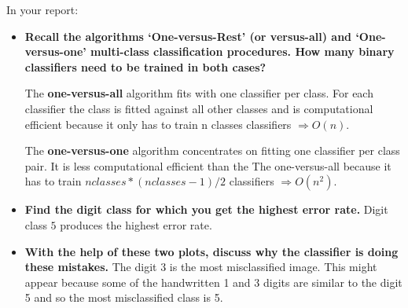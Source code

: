 \documentclass[a4paper]{article}
\begin{document}
In your report:
\begin{itemize}
\item \textbf{Recall the algorithms ‘One-versus-Rest’ (or versus-all) and ‘One-versus-one’ multi-class classification procedures. How many binary classifiers need to be trained in both cases?}

The \textbf{one-versus-all} algorithm fits with one classifier per class. For each classifier the class is fitted against all other classes and is computational efficient because it only has to train n classes classifiers $\Rightarrow O(n)$.

The \textbf{one-versus-one} algorithm concentrates on fitting one classifier per class pair. It is less computational efficient than the The one-versus-all because it has to train $n classes * (n classes - 1) / 2$ classifiers $\Rightarrow O(n^{2})$.

\item \textbf{Find the digit class for which you get the highest error rate.} Digit class $5$ produces the highest error rate.

\item \textbf{With the help of these two plots, discuss why the classifier is doing these mistakes.}
The digit 3 is the most misclassified image. This might appear because some of the handwritten 1 and 3 digits are similar to the digit 5 and so the most misclassified class is 5.
\end{itemize}
\end{document}
